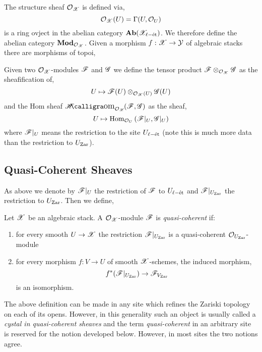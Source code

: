 \documentclass[12pt]{article}
\begin{document}
\begin{defn}
The structure sheaf $\mathcal{O}_{\mathscr{X}}$ is defined via,
\[ \mathcal{O}_{\mathscr{X}}(U) = \Gamma(U, \mathcal{O}_{U}) \]
is a ring ovject in the abelian category $\mathbf{Ab}(\mathscr{X}_{\ell-\text{\'{e}t}})$. We therefore define the abelian category $\mathbf{Mod}_{\mathcal{O}_{\mathscr{X}}}$. Given a morphism $f : \mathscr{X} \to \mathcal{Y}$ of algebraic stacks there are morphisms of topoi,
\begin{center}
\end{center}
Given two $\mathcal{O}_{\mathscr{X}}$-modules $\mathscr{F}$ and $\mathscr{G}$ we define the tensor product $\mathscr{F} \otimes_{\mathcal{O}_{\mathscr{X}}} \mathscr{G}$ as the sheafification of,
\[ U \mapsto \mathscr{F}(U) \otimes_{\mathcal{O}_{\mathscr{X}}(U)} \mathscr{G}(U) \]
and the Hom sheaf $\shHom{\struct{\X}}{\F}{\G}$ as the sheaf,
\[ U \mapsto \mathrm{Hom}_{\mathcal{O}_{U}} \left( \mathscr{F}|_U, \mathscr{G}|_U \right) \]
where $\mathscr{F}|_U$ means the restriction to the site $U_{\ell-\text{\'{e}t}}$ (note this is much more data than the restriction to $U_{\mathrm{Zar}}$). 
\end{defn}

\subsection{Quasi-Coherent Sheaves}

As above we denote by $\mathscr{F}|_U$ the restriction of $\mathscr{F}$ to $U_{\ell-\text{\'{e}t}}$ and $\mathscr{F}|_{U_{\mathrm{Zar}}}$ the restriction to $U_{\mathrm{Zar}}$. Then we define,

\begin{defn}
Let $\mathscr{X}$ be an algebraic stack. A $\mathcal{O}_{\mathscr{X}}$-module $\mathscr{F}$ is \textit{quasi-coherent} if:
\begin{enumerate}
\item for every smooth $U \to \mathscr{X}$ the restriction $\mathscr{F}|_{U_{\mathrm{Zar}}}$ is a quasi-coherent $\mathcal{O}_{U_{\mathrm{Zar}}}$-module
\item for every morphism $f : V \to U$ of smooth $\mathscr{X}$-schemes, the induced morphism,
\[ f^* (\mathscr{F}|_{U_{\mathrm{Zar}}}) \to \mathscr{F}_{V_{\mathrm{Zar}}} \]
is an isomorphism.
\end{enumerate}
\end{defn} 

\begin{rmk}
The above definition can be made in any site which refines the Zariski topology on each of its opens. However, in this generality such an object is usually called a \textit{cystal in quasi-coherent sheaves} and the term \textit{quasi-coherent} in an arbitrary site is reserved for the notion developed below. However, in most sites the two notions agree.
\end{rmk}
\end{document}
